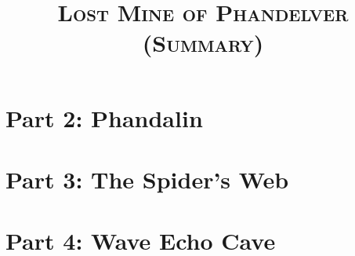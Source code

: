 \documentclass{article}
\title{\textsc{\Huge Lost Mine of Phandelver (Summary)}}
\date{ }
\begin{document}
	\maketitle
	\begin{multicols}{2}

	
	\pagebreak
	
	\pagebreak



	
	\section{Part 2: Phandalin}
	\section{Part 3: The Spider's Web}
	\section{Part 4: Wave Echo Cave}
	
	\end{multicols}
	
\end{document}
